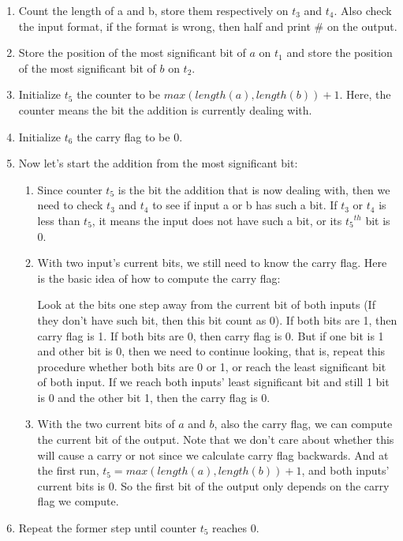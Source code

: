 \documentclass[12pt]{article}
\begin{document}
\begin{enumerate}
\item Count the length of a and b, store them respectively on $t_3$ and
  $t_4$. Also check the input format, if the format is wrong, then half
  and print \# on the output. 
\item Store the position of the most significant bit of $a$ on $t_1$
  and store the position of the most significant bit of $b$ on
  $t_2$.
\item Initialize $t_5$ the counter to be $max(length(a),
  length(b)) + 1$. Here, the counter means the bit the addition is
  currently dealing with. 
\item Initialize $t_6$ the carry flag to be $0$.
\item Now let's start the addition from the most significant bit:
  \begin{enumerate}
  \item Since counter $t_5$ is the bit the addition that is now
    dealing with, then we need to check $t_3$ and $t_4$ to see if
    input a or b has such a bit. If $t_3$ or $t_4$ is less than $t_5$,
    it means the input does not have such a bit, or its ${t_5}^{th}$
    bit is $0$.
  \item With two input's current bits, we still need to know the carry
    flag. Here is the basic idea of how to compute the carry flag:
    
    Look at the bits one step away from the current bit of both inputs
    (If they don't have such bit, then this bit count as 0). If both
    bits are 1, then carry flag is 1. If both bits are 0, then carry
    flag is 0. But if one bit is 1 and other bit is 0, then we need to
    continue looking, that is, repeat this procedure whether both bits
    are 0 or 1, or reach the least significant bit of both input. If
    we reach both inputs' least significant bit and still 1 bit is 0
    and the other bit 1, then the carry flag is 0.
  \item With the two current bits of $a$ and $b$, also the carry flag,
    we can compute the current bit of the output. Note that we don't
    care about whether this will cause a carry or not since we
    calculate carry flag backwards. And at the first run, $t_5 =
    max(length(a), length(b)) + 1$, and both inputs' current bits is
    0. So the first bit of the output only depends on the carry flag
    we compute. 
  \end{enumerate}
\item Repeat the former step until counter $t_5$ reaches 0.
\end{enumerate}
\end{document}
